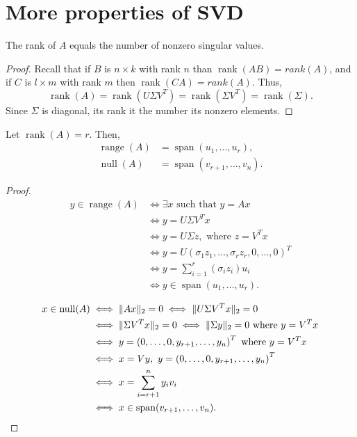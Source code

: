 \documentclass{article}
\begin{document}
\section{More properties of SVD}


\begin{lemma}
The rank of $A$ equals the number of nonzero singular values.
\end{lemma}
\begin{proof}
Recall that if $B$ is $n \times k$ with rank $n$ than
$\operatorname{rank} (AB) = rank (A)$, and if $C$ is $l \times m$
with rank $m$ then $\operatorname{rank} (CA) = rank (A)$. Thus,
\begin{equation*}
\operatorname{rank} (A) = \operatorname{rank} (U \Sigma V^{T}) =
\operatorname{rank} (\Sigma V^{T}) = \operatorname{rank} (\Sigma).
\end{equation*}
Since $\Sigma$ is diagonal, its rank it the number its nonzero
elements.
\end{proof}

\begin{lemma}
Let $\operatorname{rank}(A)=r$.
Then,
\begin{align*}
\operatorname{range}(A) &= \operatorname{span}(u_{1},\ldots,u_{r}),\\
\operatorname{null}(A) &= \operatorname{span}(v_{r+1},\ldots,v_{n}).
\end{align*}
\end{lemma}

\begin{proof}
\begin{align*}
y \in \operatorname{range}(A) & \iff \exists x \text{ such that }
y=Ax \\
& \iff y=U\Sigma V^{T}x \\
& \iff y=U \Sigma z, \text{ where }z=V^{T}x \\
& \iff y = U \left (\sigma_{1} z_{1},\ldots,\sigma_r z_{r}, 0
,\ldots,0 \right )^{T} \\
& \iff y=\sum_{i=1}^{r} (\sigma_{i}z_{i}) u_{i} \\
& \iff y \in \operatorname{span} (u_{1},\ldots, u_{r}).
\end{align*}

\medskip

\begin{align*}
x \in \operatorname{null}(A) &\iff \| Ax \|_{2}=0 \iff
\| U\Sigma V^{T} x \|_{2}=0 \\
& \iff \| \Sigma V^{T}x \|_{2} = 0 \iff \| \Sigma y \|_{2} =0
\text{ where } y=V^{T}x \\
& \iff y=\left (0 ,\ldots,0,y_{r+1},\ldots,y_{n} \right
)^{T} \text{ where } y=V^{T}x\\
& \iff x=Vy,\ y=\left (0 ,\ldots,0,y_{r+1},\ldots,y_{n}
\right )^{T} \\
& \iff x=\sum_{i=r+1}^{n} y_{i} v_{i} \\
& \iff x \in \operatorname{span}(v_{r+1},\ldots,v_{n}).
\end{align*}

\end{proof}
\end{document}
